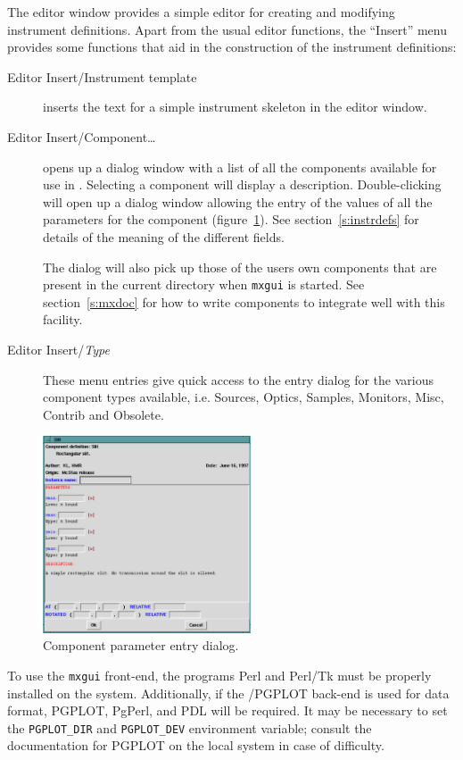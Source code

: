 The editor window provides a simple editor for creating and modifying
instrument definitions. Apart from the usual editor functions, the
``Insert'' menu provides some functions that aid in the construction of
the instrument definitions:
\begin{description}
\item[Editor Insert/Instrument template] inserts the text for a simple instrument
  skeleton in the editor window.
\item[Editor Insert/Component\ldots] opens up a dialog window with a list of all
  the components available for use in \MCX . Selecting a component will
  display a description. Double-clicking will open up a dialog window
  allowing the entry of the values of all the parameters for the
  component (figure~\ref{f:comp_dialog}). See section~\ref{s:instrdefs}
  for details of the meaning of the different fields.

The dialog will also pick up those of the users own components that are
  present in the current directory when \verb+mxgui+ is started. See
  section~\ref{s:mxdoc} for how to write components to integrate well
  with this facility.
\item[Editor Insert/\textit{Type}] These menu entries give quick access to the entry
  dialog for the various component types available, i.e. Sources,
  Optics, Samples, Monitors, Misc, Contrib and Obsolete.
\end{description}
\begin{figure}[tbp]
  \begin{center}
    \includegraphics[width=0.55\textwidth]{figures/comp_dialog.eps}
    \caption{Component parameter entry dialog.}
    \label{f:comp_dialog}
  \end{center}
\end{figure}

To use the \verb+mxgui+ front-end, the programs Perl and Perl/Tk must
be properly installed on the system. Additionally, if the \MCX /PGPLOT
back-end is used for data format, PGPLOT, PgPerl, and PDL will be
required.  It may be necessary to set the
\verb+PGPLOT_DIR+ and \verb+PGPLOT_DEV+ environment variable; consult
the documentation for PGPLOT on the local system in case of
difficulty. 

